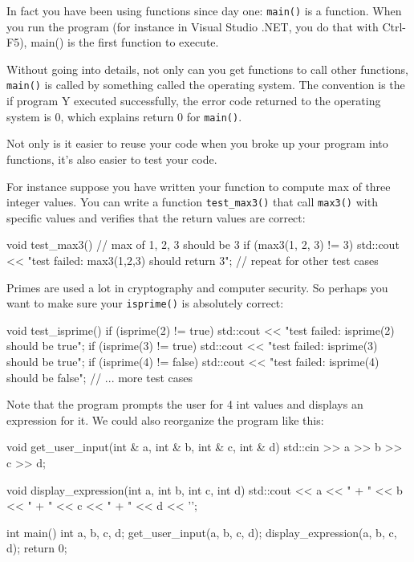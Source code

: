 In fact you have been using functions since day one: \verb!main()! is a function. When you run the program (for instance in Visual Studio .NET, you do that with Ctrl-F5), main() is the first function to execute.

Without going into details, not only can you get functions to call other functions, \texttt{main()} is called by something called the operating system. The convention is the if program Y executed successfully, the error code returned to the operating system is 0, which explains return 0 for \texttt{main()}.


\newpage{}

Not only is it easier to reuse your code when you broke up your program into functions, it's also easier to test your code.

For instance suppose you have written your function to compute max of three integer values. You can write a function \texttt{test\_max3()} that call \texttt{max3()} with specific values and verifies that the return values are correct:

\begin{consolethree}[escapeinside=||]
void test_max3()
{
    // max of 1, 2, 3 should be 3
    if (max3(1, 2, 3) != 3)
    {
        std::cout << "test failed: max3(1,2,3) should return 3\n";
    }
    // repeat for other test cases
}
\end{consolethree}

Primes are used a lot in cryptography and computer security. So perhaps you want to make sure your \texttt{isprime()} is absolutely correct:

\begin{consolethree}[escapeinside=||]
void test_isprime()
{
    if (isprime(2) != true)
    {
        std::cout << "test failed: isprime(2) should be true\n";
    }
    if (isprime(3) != true)
    {
        std::cout << "test failed: isprime(3) should be true\n";
    }
    if (isprime(4) != false)
    {
        std::cout << "test failed: isprime(4) should be false\n";
    }
    // ... more test cases
}
\end{consolethree}


\newpage{}

Note that the program prompts the user for 4 int values and displays an expression for it. We could also reorganize the program like this:

\begin{consolethree}[escapeinside=||]
void get_user_input(int & a, int & b, int & c, int & d)
{
    std::cin >> a >> b >> c >> d;
}

void display_expression(int a, int b, int c, int d)
{
    std::cout << a << " + " << b << " + " << c << " + " << d << '\n';
}

int main()
{
    int a, b, c, d;
    get_user_input(a, b, c, d);
    display_expression(a, b, c, d);
    return 0;
}
\end{consolethree}

